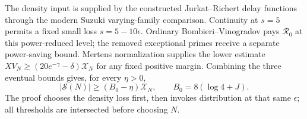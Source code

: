 The density input is supplied by the constructed Jurkat--Richert delay
functions through the modern Suzuki varying-family comparison.  Continuity
at $s=5$ permits a fixed small loss $s=5-10\epsilon$.
Ordinary Bombieri--Vinogradov pays $\mathcal R_0$ at this power-reduced
level; the removed exceptional primes receive a separate power-saving bound.
Mertens normalization supplies the lower estimate
$XV_N\ge(20e^{-\gamma}-\delta)\mathcal X_N$ for any fixed positive margin.
Combining the three eventual bounds gives, for every $\eta>0$,
\[
 |\mathcal S(N)|\ge (B_0-\eta)\mathcal X_N,\qquad B_0=8(\log4+J).
\]
The proof chooses the density loss first, then invokes distribution at that same $\epsilon$; all thresholds are intersected before choosing $N$.


